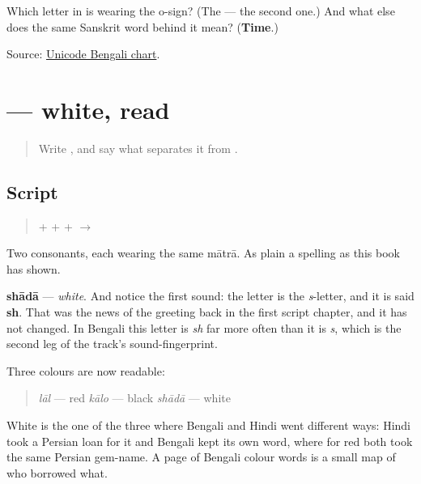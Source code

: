 \begin{tcolorbox}[breakable,colback=teal!4,colframe=teal!35!black,title={Before you move on}]
Which letter in \textbf{} is wearing the o-sign? (The \textbf{} — the second one.) And what else does the same Sanskrit word behind it mean? (\textbf{Time}.)

Source: \href{https://www.unicode.org/charts/PDF/U0980.pdf}{Unicode Bengali chart}.
\end{tcolorbox}
\section[shādā]{ — white, read}

\label{lesson:BN-W03-shada-read}



\begin{quote}
Write \textbf{}, and say what separates it from \textbf{}.
\end{quote}

\subsection*{Script}
\begin{quote}
\textbf{} + \textbf{} + \textbf{} + \textbf{} $\to$ \textbf{}
\end{quote}

Two consonants, each wearing the same mātrā. As plain a spelling as this book has shown.

\textbf{shādā} — \emph{white}. And notice the first sound: the letter is the \emph{s}-letter, and it is said \textbf{sh}. That was the news of the greeting back in the first script chapter, and it has not changed. In Bengali this letter is \emph{sh} far more often than it is \emph{s}, which is the second leg of the track's sound-fingerprint.

Three colours are now readable:

\begin{quote}
\textbf{} \emph{lāl} — red \textbf{} \emph{kālo} — black \textbf{} \emph{shādā} — white
\end{quote}

White is the one of the three where Bengali and Hindi went different ways: Hindi took a Persian loan for it and Bengali kept its own word, where for red both took the same Persian gem-name. A page of Bengali colour words is a small map of who borrowed what.

